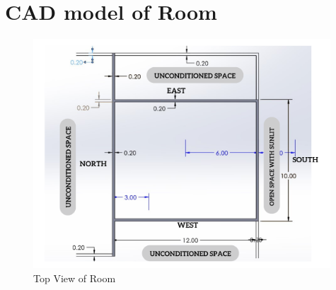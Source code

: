 \documentclass{article}
\begin{document}
\tableofcontents
\pagebreak

\section{CAD model of Room}

\begin{figure}[H]
    \centering
    \includegraphics[width=0.99\textwidth]{img/img1.png}
    \caption{Top View of Room}
    \label{fig:1}
\end{figure}
\end{document}
